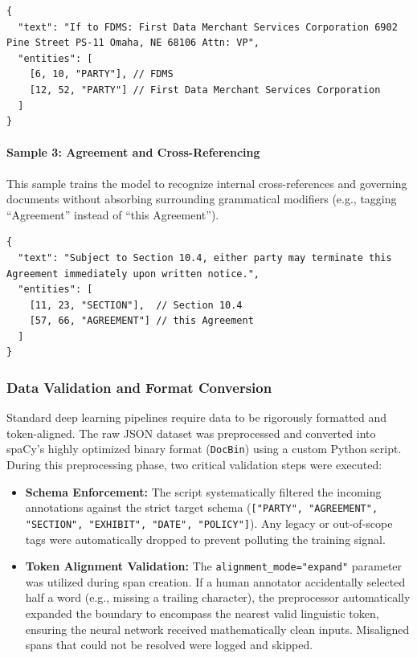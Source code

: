 \documentclass[twoside,final]{hcmut-report}
\begin{document}
\begin{verbatim}
{
  "text": "If to FDMS: First Data Merchant Services Corporation 6902 Pine Street PS-11 Omaha, NE 68106 Attn: VP",
  "entities": [
    [6, 10, "PARTY"], // FDMS
    [12, 52, "PARTY"] // First Data Merchant Services Corporation
  ]
}
\end{verbatim}

\paragraph{Sample 3: Agreement and Cross-Referencing}
This sample trains the model to recognize internal cross-references and governing documents without absorbing surrounding grammatical modifiers (e.g., tagging ``Agreement'' instead of ``this Agreement'').

\begin{verbatim}
{
  "text": "Subject to Section 10.4, either party may terminate this Agreement immediately upon written notice.",
  "entities": [
    [11, 23, "SECTION"],  // Section 10.4
    [57, 66, "AGREEMENT"] // this Agreement
  ]
}
\end{verbatim}

\subsubsection{Data Validation and Format Conversion}

Standard deep learning pipelines require data to be rigorously formatted and token-aligned. The raw JSON dataset was preprocessed and converted into spaCy's highly optimized binary format (\texttt{DocBin}) using a custom Python script. During this preprocessing phase, two critical validation steps were executed:
\begin{itemize}
  \item \textbf{Schema Enforcement:} The script systematically filtered the incoming annotations against the strict target schema (\texttt{["PARTY", "AGREEMENT", "SECTION", "EXHIBIT", "DATE", "POLICY"]}). Any legacy or out-of-scope tags were automatically dropped to prevent polluting the training signal.
  \item \textbf{Token Alignment Validation:} The \texttt{alignment\_mode="expand"} parameter was utilized during span creation. If a human annotator accidentally selected half a word (e.g., missing a trailing character), the preprocessor automatically expanded the boundary to encompass the nearest valid linguistic token, ensuring the neural network received mathematically clean inputs. Misaligned spans that could not be resolved were logged and skipped.
\end{itemize}
\end{document}

